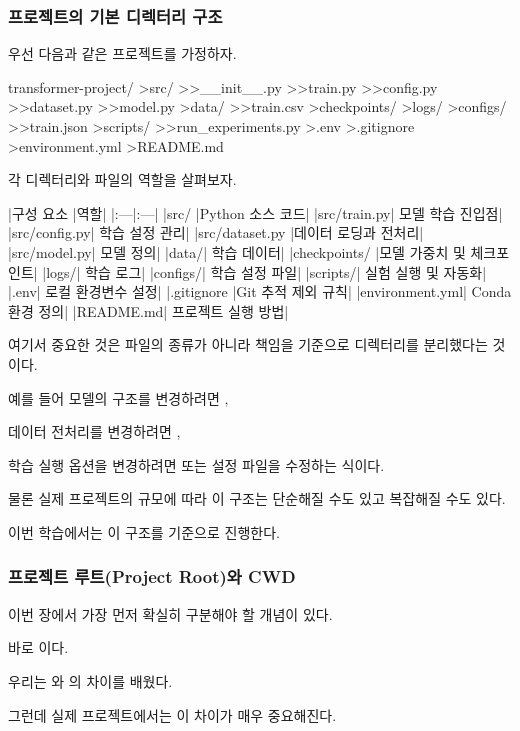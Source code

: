 \subsubsection{프로젝트의 기본 디렉터리 구조}

우선 다음과 같은 프로젝트를 가정하자.

\begin{dhkdir}[in=6]
transformer-project/
>src/
>>__init__.py
>>train.py
>>config.py
>>dataset.py
>>model.py
>data/
>>train.csv
>checkpoints/
>logs/
>configs/
>>train.json
>scripts/
>>run_experiments.py
>.env
>.gitignore
>environment.yml
>README.md
\end{dhkdir}

각 디렉터리와 파일의 역할을 살펴보자.

\begin{dhktable}
|구성 요소	|역할|
|:---|:---|
|src/	|Python 소스 코드|
|src/train.py|	모델 학습 진입점|
|src/config.py|	학습 설정 관리|
|src/dataset.py	|데이터 로딩과 전처리|
|src/model.py|	모델 정의|
|data/|	학습 데이터|
|checkpoints/	|모델 가중치 및 체크포인트|
|logs/|	학습 로그|
|configs/|	학습 설정 파일|
|scripts/|	실험 실행 및 자동화|
|.env|	로컬 환경변수 설정|
|.gitignore	|Git 추적 제외 규칙|
|environment.yml|	Conda 환경 정의|
|README.md|	프로젝트 실행 방법|
\end{dhktable}

여기서 중요한 것은 파일의 종류가 아니라 책임을 기준으로 디렉터리를 분리했다는 것이다.

예를 들어 모델의 구조를 변경하려면 ,

데이터 전처리를 변경하려면 ,

학습 실행 옵션을 변경하려면  또는 설정 파일을 수정하는 식이다.

물론 실제 프로젝트의 규모에 따라 이 구조는 단순해질 수도 있고 복잡해질 수도 있다.

이번 학습에서는 이 구조를 기준으로 진행한다.

\subsubsection{프로젝트 루트(Project Root)와 CWD}

이번 장에서 가장 먼저 확실히 구분해야 할 개념이 있다.

바로 이다.

우리는 와 의 차이를 배웠다.

그런데 실제 프로젝트에서는 이 차이가 매우 중요해진다.

